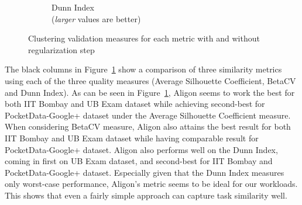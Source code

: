 \begin{figure}[h!]
\begin{subfigure}[b]{0.48\textwidth}
        \caption{Dunn Index\\(\textit{larger} values are better)}
    \end{subfigure}
    \caption{Clustering validation measures for each metric with and without regularization step}
    \label{fig:comparison2}
\end{figure}

The black columns in Figure~\ref{fig:comparison2} show a comparison of three similarity metrics using each of the three quality measures (Average Silhouette Coefficient, BetaCV and Dunn Index).  
As can be seen in Figure~\ref{fig:comparison2}, Aligon seems to work the best for both IIT Bombay and UB Exam dataset while achieving second-best for PocketData-Google+ dataset under the Average Silhouette Coefficient measure. 
When considering BetaCV measure, Aligon also attains the best result for both IIT Bombay and UB Exam dataset while having comparable result for PocketData-Google+ dataset.
Aligon also performs well on the Dunn Index, coming in first on UB Exam dataset, and second-best for IIT Bombay and PocketData-Google+ dataset.
Especially given that the Dunn Index measures only worst-case performance, Aligon's metric seems to be ideal for our workloads.
This shows that even a fairly simple approach can capture task similarity well. 


